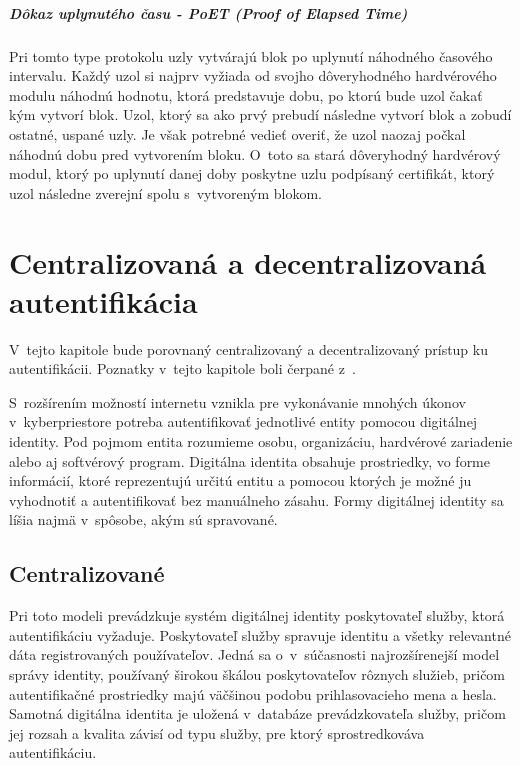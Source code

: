 \paragraph{Dôkaz uplynutého času - PoET (Proof of Elapsed Time)}

Pri tomto type protokolu uzly vytvárajú blok po uplynutí náhodného časového intervalu. Každý uzol si najprv vyžiada od svojho dôveryhodného hardvérového modulu náhodnú hodnotu, ktorá predstavuje dobu, po ktorú bude uzol čakať kým vytvorí blok. Uzol, ktorý sa ako prvý prebudí následne vytvorí blok a zobudí ostatné, uspané uzly. Je však potrebné vedieť overiť, že uzol naozaj počkal náhodnú dobu pred vytvorením bloku. O~toto sa stará dôveryhodný hardvérový modul, ktorý po uplynutí danej doby poskytne uzlu podpísaný certifikát, ktorý uzol následne zverejní spolu s~vytvoreným blokom.


\chapter{Centralizovaná a decentralizovaná autentifikácia}

V~tejto kapitole bude porovnaný centralizovaný a decentralizovaný prístup ku autentifikácii. Poznatky v~tejto kapitole boli čerpané z~\cite{auth_sys_comparison}.

S~rozšírením možností internetu vznikla pre vykonávanie mnohých úkonov v~kyberpriestore potreba autentifikovať jednotlivé entity pomocou digitálnej identity. Pod pojmom entita rozumieme osobu, organizáciu, hardvérové zariadenie alebo aj softvérový program. Digitálna identita obsahuje prostriedky, vo forme informácií, ktoré reprezentujú určitú entitu a pomocou ktorých je možné ju vyhodnotiť a autentifikovať bez manuálneho zásahu. Formy digitálnej identity sa líšia najmä v~spôsobe, akým sú spravované.

\section{Centralizované}

Pri toto modeli prevádzkuje systém digitálnej identity poskytovateľ služby, ktorá autentifikáciu vyžaduje. Poskytovateľ služby spravuje identitu a všetky relevantné dáta registrovaných používateľov. Jedná sa o~v~súčasnosti najrozšírenejší model správy identity, používaný širokou škálou poskytovateľov rôznych služieb, pričom autentifikačné prostriedky majú väčšinou podobu prihlasovacieho mena a hesla. Samotná digitálna identita je uložená v~databáze prevádzkovateľa služby, pričom jej rozsah a kvalita závisí od typu služby, pre ktorý sprostredkováva autentifikáciu.

